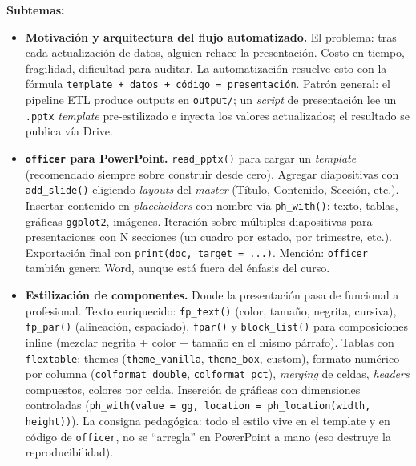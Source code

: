 \documentclass[11pt,letterpaper]{article}
\newcommand{\blue}[1]{{\color{cerulean}#1}}
\begin{document}
\textbf{Subtemas:}

\begin{itemize}[leftmargin=*, itemsep=2pt]
    \item \textbf{Motivación y arquitectura del flujo automatizado.} El problema: tras cada actualización de datos, alguien rehace la presentación. Costo en tiempo, fragilidad, dificultad para auditar. La automatización resuelve esto con la fórmula \texttt{template + datos + código = presentación}. Patrón general: el pipeline ETL produce outputs en \texttt{output/}; un \textit{script} de presentación lee un \texttt{.pptx} \textit{template} pre-estilizado e inyecta los valores actualizados; el resultado se publica vía Drive.
    \item \textbf{\texttt{officer} para PowerPoint.} \texttt{read\_pptx()} para cargar un \textit{template} (recomendado siempre sobre construir desde cero). Agregar diapositivas con \texttt{add\_slide()} eligiendo \textit{layouts} del \textit{master} (Título, Contenido, Sección, etc.). Insertar contenido en \textit{placeholders} con nombre vía \texttt{ph\_with()}: texto, tablas, gráficas \texttt{ggplot2}, imágenes. Iteración sobre múltiples diapositivas para presentaciones con N secciones (un cuadro por estado, por trimestre, etc.). Exportación final con \texttt{print(doc, target = ...)}. Mención: \texttt{officer} también genera Word, aunque está fuera del énfasis del curso.
    \item \textbf{Estilización de componentes.} Donde la presentación pasa de funcional a profesional. Texto enriquecido: \texttt{fp\_text()} (color, tamaño, negrita, cursiva), \texttt{fp\_par()} (alineación, espaciado), \texttt{fpar()} y \texttt{block\_list()} para composiciones inline (mezclar negrita + color + tamaño en el mismo párrafo). Tablas con \texttt{flextable}: themes (\texttt{theme\_vanilla}, \texttt{theme\_box}, custom), formato numérico por columna (\texttt{colformat\_double}, \texttt{colformat\_pct}), \textit{merging} de celdas, \textit{headers} compuestos, colores por celda. Inserción de gráficas con dimensiones controladas (\texttt{ph\_with(value = gg, location = ph\_location(width, height))}). La consigna pedagógica: \blue{todo el estilo vive en el template y en código de \texttt{officer}, no se ``arregla'' en PowerPoint a mano} (eso destruye la reproducibilidad).

\end{itemize}
\end{document}
